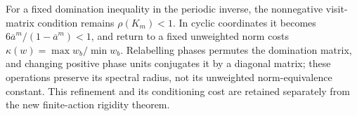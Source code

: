 For a fixed domination inequality in the periodic inverse, the
nonnegative visit-matrix condition remains
$\rho(K_m)<1$.  In cyclic coordinates it becomes
$6\overline a^m/(1-\overline a^m)<1$, and return to a fixed unweighted
norm costs $\kappa(w)=\max w_b/\min w_b$.  Relabelling phases permutes
the domination matrix, and changing positive phase units conjugates it
by a diagonal matrix; these operations preserve its spectral radius,
not its unweighted norm-equivalence constant.  This refinement and its
conditioning cost are retained separately from the new finite-action
rigidity theorem.
